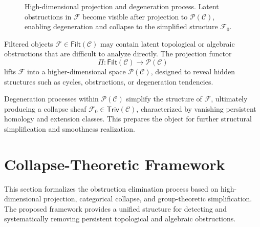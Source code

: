\documentclass[11pt]{article}
\begin{document}
\begin{figure}[h]
\centering
{}
\caption{High-dimensional projection and degeneration process. Latent obstructions in $\mathcal{F}$ become visible after projection to $\mathcal{P}(\mathcal{C})$, enabling degeneration and collapse to the simplified structure $\mathcal{F}_0$.}
\label{fig:projection}
\end{figure}

Filtered objects $\mathcal{F} \in \mathsf{Filt}(\mathcal{C})$ may contain latent topological or algebraic obstructions that are difficult to analyze directly. The projection functor
\[
\Pi : \mathsf{Filt}(\mathcal{C}) \longrightarrow \mathcal{P}(\mathcal{C})
\]
lifts $\mathcal{F}$ into a higher-dimensional space $\mathcal{P}(\mathcal{C})$, designed to reveal hidden structures such as cycles, obstructions, or degeneration tendencies.

Degeneration processes within $\mathcal{P}(\mathcal{C})$ simplify the structure of $\mathcal{F}$, ultimately producing a collapse sheaf $\mathcal{F}_0 \in \mathsf{Triv}(\mathcal{C})$, characterized by vanishing persistent homology and extension classes. This prepares the object for further structural simplification and smoothness realization.



\section{Collapse-Theoretic Framework}

This section formalizes the obstruction elimination process based on high-dimensional projection, categorical collapse, and group-theoretic simplification. The proposed framework provides a unified structure for detecting and systematically removing persistent topological and algebraic obstructions.
\end{document}

